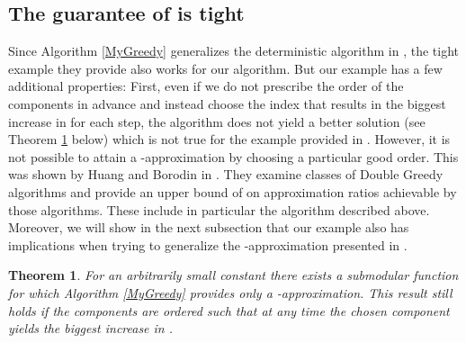 \documentclass{article}
\theoremstyle{plain}
\newtheorem{theorem}{Theorem}
\theoremstyle{definition}
\begin{document}
\subsection{The guarantee of  is tight}\label{subsec:TightExampleSec}
Since Algorithm \ref{MyGreedy} generalizes the deterministic algorithm in \cite{DoubleGreedy}, 
the tight example they provide also works for our algorithm. But our example has a few additional properties: 
First, even if we do not prescribe the order of the components in advance 
and instead choose the index that results in the biggest increase in  for each step, 
the algorithm does not yield a better solution (see Theorem \ref{AlgoTightThm} below) which is not true for 
 the example provided in \cite{DoubleGreedy}.
However, it is not possible to attain a -approximation by choosing a particular good order. 
This was shown by Huang and Borodin in \cite{BorodinMyopicBounds}. 
They examine classes of Double Greedy algorithms and provide an upper bound of 
 on approximation ratios achievable by those algorithms. 
These include in particular the algorithm described above. 
Moreover, we will show in the next subsection that our example also has implications when trying to generalize the 
-approximation presented in \cite{DoubleGreedy}.
\begin{theorem}
\label{AlgoTightThm}
 For an arbitrarily small constant  there exists a submodular function 
 for which Algorithm \ref{MyGreedy} provides only a -approximation.
 This result still holds if the components are ordered such that at any time the
 chosen component yields the biggest increase in .
\end{theorem}
\end{document}
